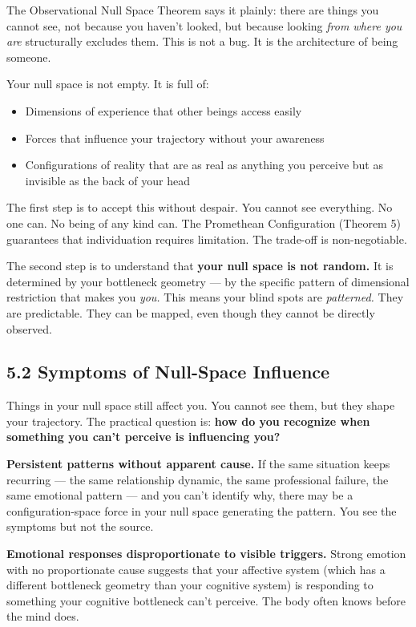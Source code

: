 The Observational Null Space Theorem says it plainly: there are things you cannot see, not because you haven't looked, but because looking \textit{from where you are} structurally excludes them. This is not a bug. It is the architecture of being someone.


Your null space is not empty. It is full of:

\begin{itemize}[nosep,leftmargin=*]
  \item Dimensions of experience that other beings access easily
  \item Forces that influence your trajectory without your awareness
  \item Configurations of reality that are as real as anything you perceive but as invisible as the back of your head
\end{itemize}


The first step is to accept this without despair. You cannot see everything. No one can. No being of any kind can. The Promethean Configuration (Theorem 5) guarantees that individuation requires limitation. The trade-off is non-negotiable.


The second step is to understand that \textbf{your null space is not random.} It is determined by your bottleneck geometry — by the specific pattern of dimensional restriction that makes you \textit{you.} This means your blind spots are \textit{patterned.} They are predictable. They can be mapped, even though they cannot be directly observed.


\subsection*{5.2 Symptoms of Null-Space Influence}


Things in your null space still affect you. You cannot see them, but they shape your trajectory. The practical question is: \textbf{how do you recognize when something you can't perceive is influencing you?}


\textbf{Persistent patterns without apparent cause.} If the same situation keeps recurring — the same relationship dynamic, the same professional failure, the same emotional pattern — and you can't identify why, there may be a configuration-space force in your null space generating the pattern. You see the symptoms but not the source.


\textbf{Emotional responses disproportionate to visible triggers.} Strong emotion with no proportionate cause suggests that your affective system (which has a different bottleneck geometry than your cognitive system) is responding to something your cognitive bottleneck can't perceive. The body often knows before the mind does.


